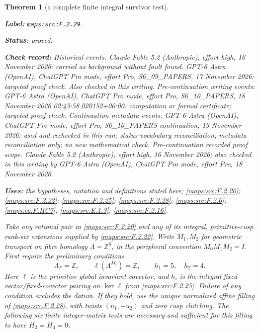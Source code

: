 \documentclass[11pt,a4paper]{article}
\newtheorem{theorem}{Theorem}[section]
\theoremstyle{definition}
\newcommand{\StatementRecord}[4]{\par\smallskip\begingroup\upshape\raggedright\noindent\textbf{Label:} \nolinkurl{#1}.\par\noindent\textbf{Status:} #2.\par\noindent\textbf{Check record:} #3.\par\noindent\textbf{Uses:} #4.\par\endgroup\smallskip}
\begin{document}
\begin{theorem}[a complete finite integral survivor test]\label{maps:src:F.2.29}
\StatementRecord{maps:src:F.2.29}{proved}{Historical events: Claude Fable 5.2 (Anthropic), effort high, 16 November 2026: carried as background without fault found. GPT-6 Astra (OpenAI), ChatGPT Pro mode, effort Pro, S6\_09\_PAPERS, 17 November 2026: targeted proof check. Also checked in this writing. Pre-continuation writing events: GPT-6 Astra (OpenAI), ChatGPT Pro mode, effort Pro, S6\_10\_PAPERS, 18 November 2026 02:43:58.020152+00:00: computation or formal certificate; targeted proof check. Continuation metadata events: GPT-6 Astra (OpenAI), ChatGPT Pro mode, effort Pro, S6\_10\_PAPERS continuation, 19 November 2026: used and rechecked in this run; status-vocabulary reconciliation; metadata reconciliation only; no new mathematical check. \emph{Pre-continuation recorded proof scope.} Claude Fable 5.2 (Anthropic), effort high, 16 November 2026; also checked in this writing by GPT-6 Astra (OpenAI), ChatGPT Pro mode, effort Pro, 18 November 2026}{the hypotheses, notation and definitions stated here; \cref{maps:src:F.2.20}; \cref{maps:src:F.2.22}; \cref{maps:src:F.2.25}; \cref{maps:src:F.2.28}; \cref{maps:src:F.2.6}; \cref{maps:eq:F.HC7}; \cref{maps:src:E.1.3}; \cref{maps:src:F.2.16}}


Take any rational pair in \ref{maps:src:F.2.20} and any of its integral,
primitive-cusp rank-six extensions supplied by \ref{maps:src:F.2.22}.
Write $M_1,M_2$ for geometric transport on fibre homology
$\Lambda=\mathbb Z^6$, in the peripheral convention
$M_0M_1M_2=I$.
First require the preliminary conditions
\[
 \Lambda_\Gamma=\mathbb Z,\qquad
 \ell(\Lambda^{M_i})=\mathbb Z,\qquad h_1=5,\quad h_2=4 .
 \tag{F.HC1}\label{maps:eq:F.HC1}
\]
Here $\ell$ is the primitive global invariant covector, and
$h_i$ is the integral fixed-vector/fixed-covector pairing
on $\ker\ell$ from \ref{maps:src:F.2.25}.
Failure of any condition excludes the datum.
If they hold, use the unique normalized affine filling of
\ref{maps:src:F.2.28}, with twists $(u_1,-u_2)$ and zero cusp clutching.
The following six finite integer-matrix tests are necessary
and sufficient for this filling to have $H_2=H_3=0$.


\end{theorem}
\end{document}
